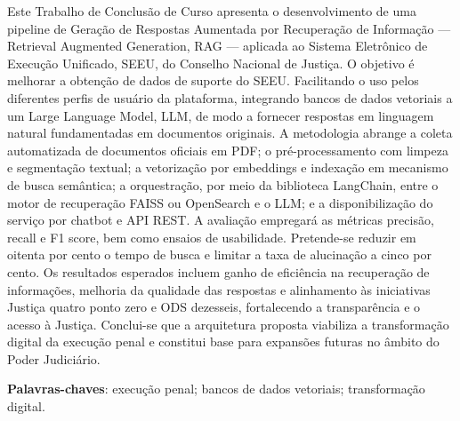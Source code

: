 %
%

\begin{RESUMO}
\thispagestyle{empty}
\OnehalfSpacing

\noindent Este Trabalho de Conclusão de Curso apresenta o desenvolvimento de uma pipeline de Geração de Respostas Aumentada por Recuperação de Informação — Retrieval Augmented Generation, RAG — aplicada ao Sistema Eletrônico de Execução Unificado, SEEU, do Conselho Nacional de Justiça. O objetivo é melhorar a obtenção de dados de suporte do SEEU. Facilitando o uso pelos diferentes perfis de usuário da plataforma, integrando bancos de dados vetoriais a um Large Language Model, LLM, de modo a fornecer respostas em linguagem natural fundamentadas em documentos originais. A metodologia abrange a coleta automatizada de documentos oficiais em PDF; o pré-processamento com limpeza e segmentação textual; a vetorização por embeddings e indexação em mecanismo de busca semântica; a orquestração, por meio da biblioteca LangChain, entre o motor de recuperação FAISS ou OpenSearch e o LLM; e a disponibilização do serviço por chatbot e API REST. A avaliação empregará as métricas precisão, recall e F1 score, bem como ensaios de usabilidade. Pretende-se reduzir em oitenta por cento o tempo de busca e limitar a taxa de alucinação a cinco por cento. Os resultados esperados incluem ganho de eficiência na recuperação de informações, melhoria da qualidade das respostas e alinhamento às iniciativas Justiça quatro ponto zero e ODS dezesseis, fortalecendo a transparência e o acesso à Justiça. Conclui-se que a arquitetura proposta viabiliza a transformação digital da execução penal e constitui base para expansões futuras no âmbito do Poder Judiciário.

\SingleSpacing
\noindent \textbf{Palavras-chaves}: execução penal; bancos de dados vetoriais; transformação digital.

\end{RESUMO}

